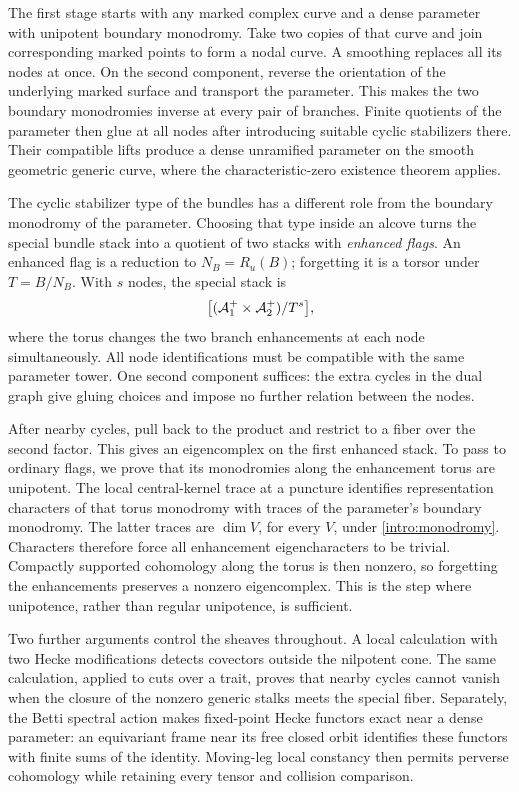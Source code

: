 The first stage starts with any marked complex curve and a dense parameter with unipotent boundary monodromy. Take two copies of that curve and join corresponding marked points to form a nodal curve. A smoothing replaces all its nodes at once. On the second component, reverse the orientation of the underlying marked surface and transport the parameter. This makes the two boundary monodromies inverse at every pair of branches. Finite quotients of the parameter then glue at all nodes after introducing suitable cyclic stabilizers there. Their compatible lifts produce a dense unramified parameter on the smooth geometric generic curve, where the characteristic-zero existence theorem applies.

The cyclic stabilizer type of the bundles has a different role from the boundary monodromy of the parameter. Choosing that type inside an alcove turns the special bundle stack into a quotient of two stacks with \emph{enhanced flags}. An enhanced flag is a reduction to $N_B=R_u(B)$; forgetting it is a torsor under $T=B/N_B$. With $s$ nodes, the special stack is
\[
 \bigl[(\mathcal A_1^+\times\mathcal A_2^+)/T^s\bigr],
\]
where the torus changes the two branch enhancements at each node simultaneously. All node identifications must be compatible with the same parameter tower. One second component suffices: the extra cycles in the dual graph give gluing choices and impose no further relation between the nodes.

After nearby cycles, pull back to the product and restrict to a fiber over the second factor. This gives an eigencomplex on the first enhanced stack. To pass to ordinary flags, we prove that its monodromies along the enhancement torus are unipotent. The local central-kernel trace at a puncture identifies representation characters of that torus monodromy with traces of the parameter's boundary monodromy. The latter traces are $\dim V$, for every $V$, under \eqref{intro:monodromy}. Characters therefore force all enhancement eigencharacters to be trivial. Compactly supported cohomology along the torus is then nonzero, so forgetting the enhancements preserves a nonzero eigencomplex. This is the step where unipotence, rather than regular unipotence, is sufficient.

Two further arguments control the sheaves throughout. A local calculation with two Hecke modifications detects covectors outside the nilpotent cone. The same calculation, applied to cuts over a trait, proves that nearby cycles cannot vanish when the closure of the nonzero generic stalks meets the special fiber. Separately, the Betti spectral action makes fixed-point Hecke functors exact near a dense parameter: an equivariant frame near its free closed orbit identifies these functors with finite sums of the identity. Moving-leg local constancy then permits perverse cohomology while retaining every tensor and collision comparison.

